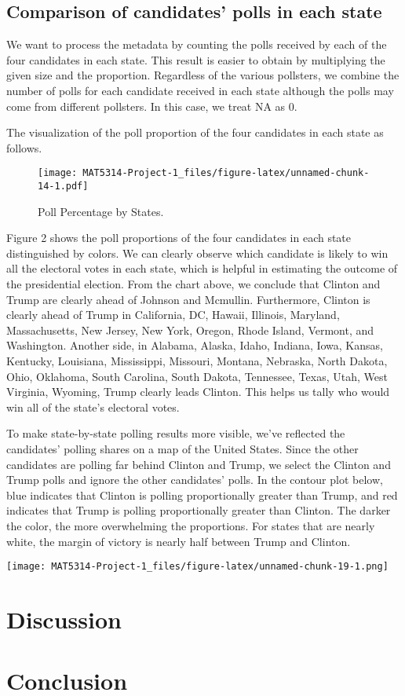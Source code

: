 \documentclass[
]{article}
\begin{document}
\hypertarget{comparison-of-candidates-polls-in-each-state}{%
\subsection{Comparison of candidates' polls in each
state}\label{comparison-of-candidates-polls-in-each-state}}

We want to process the metadata by counting the polls received by each
of the four candidates in each state. This result is easier to obtain by
multiplying the given size and the proportion. Regardless of the various
pollsters, we combine the number of polls for each candidate received in
each state although the polls may come from different pollsters. In this
case, we treat NA as 0.

The visualization of the poll proportion of the four candidates in each
state as follows.

\begin{figure}
\centering
\texttt{[image: MAT5314-Project-1\_files/figure-latex/unnamed-chunk-14-1.pdf]}
\caption{Poll Percentage by States.}
\end{figure}

Figure 2 shows the poll proportions of the four candidates in each state
distinguished by colors. We can clearly observe which candidate is
likely to win all the electoral votes in each state, which is helpful in
estimating the outcome of the presidential election. From the chart
above, we conclude that Clinton and Trump are clearly ahead of Johnson
and Mcmullin. Furthermore, Clinton is clearly ahead of Trump in
California, DC, Hawaii, Illinois, Maryland, Massachusetts, New Jersey,
New York, Oregon, Rhode Island, Vermont, and Washington. Another side,
in Alabama, Alaska, Idaho, Indiana, Iowa, Kansas, Kentucky, Louisiana,
Mississippi, Missouri, Montana, Nebraska, North Dakota, Ohio, Oklahoma,
South Carolina, South Dakota, Tennessee, Texas, Utah, West Virginia,
Wyoming, Trump clearly leads Clinton. This helps us tally who would win
all of the state's electoral votes.

To make state-by-state polling results more visible, we've reflected the
candidates' polling shares on a map of the United States. Since the
other candidates are polling far behind Clinton and Trump, we select the
Clinton and Trump polls and ignore the other candidates' polls. In the
contour plot below, blue indicates that Clinton is polling
proportionally greater than Trump, and red indicates that Trump is
polling proportionally greater than Clinton. The darker the color, the
more overwhelming the proportions. For states that are nearly white, the
margin of victory is nearly half between Trump and Clinton.

\texttt{[image: MAT5314-Project-1\_files/figure-latex/unnamed-chunk-19-1.png]}

\hypertarget{discussion}{%
\section{Discussion}\label{discussion}}

\hypertarget{conclusion}{%
\section{Conclusion}\label{conclusion}}
\end{document}

